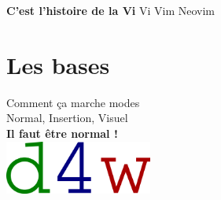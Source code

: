 \documentclass[10pt]{beamer}
\begin{document}
\begin{frame}{\textbf{C'est l'histoire de la Vi}}
	Vi \rightarrow Vim \rightarrow Neovim\\
	\vspace{20pt}

	\hspace{10pt}

\end{frame}

\section{Les bases}
	\begin{frame}{Comment ça marche}
		\center
		\huge {} modes\\
		\vspace{5pt}
		\large Normal, Insertion, Visuel\\
		\vspace{20pt}
		\textbf{Il faut être normal !}\\
		\vspace{30pt}
		\includegraphics[height=50pt]{img/example.png}
	\end{frame}
\end{document}
